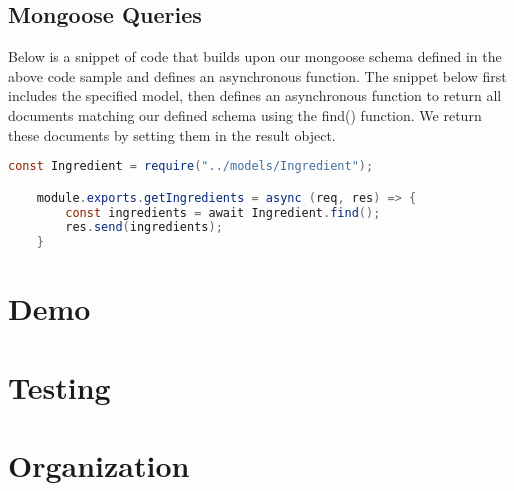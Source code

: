 \subsection*{Mongoose Queries}

Below is a snippet of code that builds upon our mongoose schema defined in the above code sample and defines an asynchronous function. The snippet below first includes the specified model, then defines an asynchronous function to return all documents matching our defined schema using the find() function. We return these documents by setting them in the result object.

\begin{lstlisting}[language=Java]
    const Ingredient = require("../models/Ingredient");

    module.exports.getIngredients = async (req, res) => {
        const ingredients = await Ingredient.find();
        res.send(ingredients);
    }
\end{lstlisting}
    
\section{Demo}

\section{Testing}

\section{Organization}
